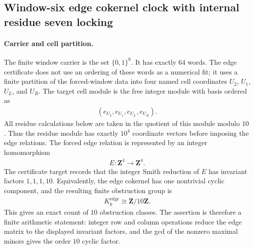 \subsection{Window-six edge cokernel clock with internal residue seven locking}\label{sec:window6-edge-cokernel-clock-internal-residue-7-locking}

\paragraph{Carrier and cell partition.}
The finite window carrier is the set $\{0,1\}^6$. It has exactly $64$ words. The edge certificate does not use an ordering of these words as a numerical fit; it uses a finite partition of the forced-window data into four named cell coordinates
$U_2$, $U_1$, $U_L$, and $U_R$. The target cell module is the free integer module with basis ordered as
$$
\begin{aligned}
(e_{U_2},e_{U_1},e_{U_L},e_{U_R}).
\end{aligned}
$$
All residue calculations below are taken in the quotient of this module modulo $10$. Thus the residue module has exactly $10^4$ coordinate vectors before imposing the edge relations. The forced edge relation is represented by an integer homomorphism
$$
\begin{aligned}
E:\mathbf{Z}^4\longrightarrow \mathbf{Z}^4.
\end{aligned}
$$
The certificate target records that the integer Smith reduction of $E$ has invariant factors $1,1,1,10$. Equivalently, the edge cokernel has one nontrivial cyclic component, and the resulting finite obstruction group is
$$
\begin{aligned}
K^{\mathrm{edge}}_6 \cong \mathbf{Z}/10\mathbf{Z}.
\end{aligned}
$$
This gives an exact count of $10$ obstruction classes. The assertion is therefore a finite arithmetic statement: integer row and column operations reduce the edge matrix to the displayed invariant factors, and the gcd of the nonzero maximal minors gives the order $10$ cyclic factor.

